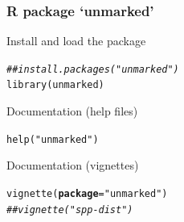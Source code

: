 \documentclass[color=usenames,dvipsnames]{beamer}\usepackage[]{graphicx}\usepackage[]{xcolor}
\makeatletter
\newcommand{\hlsng}[1]{\textcolor[rgb]{0.749,0.012,0.012}{#1}}%
\newcommand{\hlcom}[1]{\textcolor[rgb]{0.514,0.506,0.514}{\textit{#1}}}%
\newcommand{\hldef}[1]{\textcolor[rgb]{0,0,0}{#1}}%
\newcommand{\hlkwc}[1]{\textcolor[rgb]{0,0,0}{\textbf{#1}}}%
\newcommand{\hlkwd}[1]{\textcolor[rgb]{0.004,0.004,0.506}{#1}}%
\newenvironment{kframe}{%
 \def\at@end@of@kframe{}%
 \ifinner\ifhmode%
  \def\at@end@of@kframe{\end{minipage}}%
  \begin{minipage}{\columnwidth}%
 \fi\fi%
 \def\FrameCommand##1{\hskip\@totalleftmargin \hskip-\fboxsep
 \colorbox{shadecolor}{##1}\hskip-\fboxsep
     \hskip-\linewidth \hskip-\@totalleftmargin \hskip\columnwidth}%
 \MakeFramed {\advance\hsize-\width
   \@totalleftmargin\z@ \linewidth\hsize
   \@setminipage}}%
 {\par\unskip\endMakeFramed%
 \at@end@of@kframe}
\newenvironment{knitrout}{}{} %
\makeatother
\begin{document}
\begin{frame}[fragile]
  \frametitle{R package `unmarked'}
  \normalsize
  Install and load the package  %
  \vspace{-12pt}
\begin{knitrout}
\color{fgcolor}\begin{kframe}
\begin{alltt}
\hlcom{## install.packages("unmarked")  }
\hlkwd{library}\hldef{(unmarked)}
\end{alltt}
\end{kframe}
\end{knitrout}
\pause
\vfill
Documentation (help files) %
  \vspace{-12pt}
\begin{knitrout}
\color{fgcolor}\begin{kframe}
\begin{alltt}
\hlkwd{help}\hldef{(}\hlsng{"unmarked"}\hldef{)}
\end{alltt}
\end{kframe}
\end{knitrout}
\vfill
Documentation (vignettes) %
  \vspace{-12pt}
\begin{knitrout}
\color{fgcolor}\begin{kframe}
\begin{alltt}
\hlkwd{vignette}\hldef{(}\hlkwc{package}\hldef{=}\hlsng{"unmarked"}\hldef{)}
\hlcom{## vignette("spp-dist")}
\end{alltt}
\end{kframe}
\end{knitrout}

\end{frame}
\end{document}
